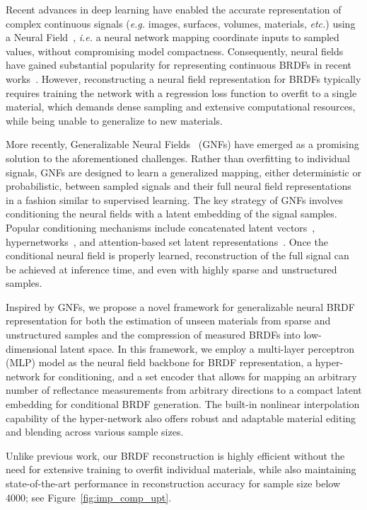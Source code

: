 Recent advances in deep learning have enabled the accurate representation of complex continuous signals (\textit{e.g.} images, surfaces, volumes, materials, \textit{etc.}) using a Neural Field~\cite{sitzmann2020siren, ffn, cnf2023}, \textit{i.e.} a neural network mapping coordinate inputs to sampled values, without compromising model compactness. Consequently, neural fields have gained substantial popularity for representing continuous BRDFs in recent works~\cite{sztrajman2021neural, cnf2023}. However, reconstructing a neural field representation for BRDFs typically requires training the network with a regression loss function to overfit to a single material, which demands dense sampling and extensive computational resources, while being unable to generalize to new materials.

More recently, Generalizable Neural Fields~\cite{rebain2022attention} (GNFs) have emerged as a promising solution to the aforementioned challenges. Rather than overfitting to individual signals, GNFs are designed to learn a generalized mapping, either deterministic or probabilistic, between sampled signals and their full neural field representations in a fashion similar to supervised learning.
The key strategy of GNFs involves conditioning the neural fields with a latent embedding of the signal samples. Popular conditioning mechanisms include concatenated latent vectors~\cite{park2019deepsdf}, hypernetworks~\cite{ha2017hypernetworks}, and attention-based set latent representations~\cite{jiang2021cotr}. Once the conditional neural field is properly learned, reconstruction of the full signal can be achieved at inference time, and even with highly sparse and unstructured samples.


Inspired by GNFs, we propose a novel framework for generalizable neural BRDF representation for both the estimation of unseen materials from sparse and unstructured samples and the compression of measured BRDFs into low-dimensional latent space. In this framework, we employ a multi-layer perceptron (MLP) model as the neural field backbone for BRDF representation, a hyper-network for conditioning, and a set encoder that allows for mapping an arbitrary number of reflectance measurements from arbitrary directions to a compact latent embedding for conditional BRDF generation. 
The built-in nonlinear interpolation capability of the hyper-network also offers robust and adaptable material editing and blending across various sample sizes.


Unlike previous work, our BRDF reconstruction is highly efficient without the need for extensive training to overfit individual materials, while also maintaining state-of-the-art performance in reconstruction accuracy for sample size below 4000; see Figure~\ref{fig:imp_comp_upt}.


